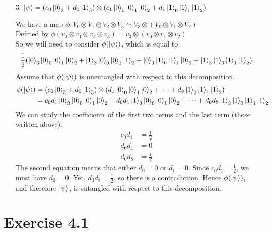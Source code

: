 \documentclass[11pt]{article}
\def\haf{\frac{1}{2}}
\begin{document}
\begin{itemize}
\begin{enumerate}
            
        \newpage
        \item[3.]
        $\ket{\psi} = (c_0\ket{0}_3 + d_0\ket{1}_3) 
        \otimes (c_1\ket{0}_0\ket{0}_1\ket{0}_2 + d_1\ket{1}_0\ket{1}_1\ket{1}_2)$

             We have a map $\phi : V_0 \otimes V_1 \otimes V_2 \otimes V_3 \simeq V_3 \otimes (V_0 \otimes V_1 \otimes V_2)$ \\
            Defined by $\phi(v_0 \otimes v_1 \otimes v_2 \otimes v_3) = v_3 \otimes (v_0 \otimes v_1 \otimes v_2) $ \\
            So we will need to consider $\phi(\ket{\psi})$, which is equal to 
            $$\haf(\ket{0}_3\ket{0}_0\ket{0}_1\ket{0}_2 + \ket{1}_3\ket{0}_0\ket{0}_1\ket{1}_2 + \ket{0}_3\ket{1}_0\ket{1}_1\ket{0}_2 + \ket{1}_3 \ket{1}_0\ket{1}_1\ket{1}_2)$$
            Assume that $\phi(\ket{\psi})$ is unentangled with respect to this decomposition.
            \begin{align*}
                \phi(\ket{\psi})
                &= (c_0\ket{0}_3 + d_0\ket{1}_3) \otimes (d_1\ket{0}_0\ket{0}_1\ket{0}_2 + \cdots + d_8\ket{1}_0\ket{1}_1\ket{1}_2) \\
                &= c_0d_1\ket{0}_3\ket{0}_0\ket{0}_1\ket{0}_2 + d_0d_1\ket{1}_3\ket{0}_0\ket{0}_1\ket{0}_2 + \cdots + d_0d_8\ket{1}_3\ket{1}_0\ket{1}_1\ket{1}_2
            \end{align*}
            We can study the coefficients of the first two terms and the last term (those written above).
            \begin{align*}
                c_0d_1 &= \haf \\
                d_0d_1 &= 0 \\
                d_0d_8 &= \haf
            \end{align*}
         The second equation means that either $d_0 = 0$ or $d_1 = 0$. Since $c_0d_1 = \haf$, we must have $d_0 = 0$.
            Yet, $d_0d_8 = \haf$, so there is a contradiction. 
            Hence $\phi(\ket{\psi})$, and therefore $\ket{\psi}$, is entangled with respect to this decomposition.
        \end{enumerate}
\end{itemize}

\newpage
\section*{Exercise 4.1}
\end{document}

